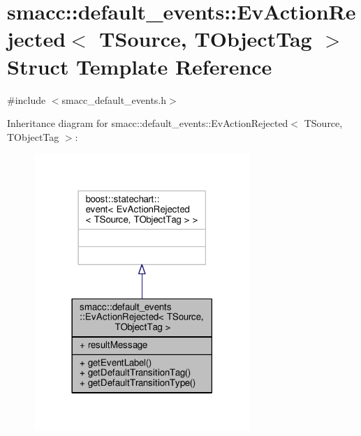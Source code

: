 \hypertarget{structsmacc_1_1default__events_1_1EvActionRejected}{}\section{smacc\+:\+:default\+\_\+events\+:\+:Ev\+Action\+Rejected$<$ T\+Source, T\+Object\+Tag $>$ Struct Template Reference}
\label{structsmacc_1_1default__events_1_1EvActionRejected}


{\ttfamily \#include $<$smacc\+\_\+default\+\_\+events.\+h$>$}



Inheritance diagram for smacc\+:\+:default\+\_\+events\+:\+:Ev\+Action\+Rejected$<$ T\+Source, T\+Object\+Tag $>$\+:\nopagebreak
\begin{figure}[H]
\begin{center}
\leavevmode
\includegraphics[width=230pt]{structsmacc_1_1default__events_1_1EvActionRejected__inherit__graph}
\end{center}
\end{figure}


